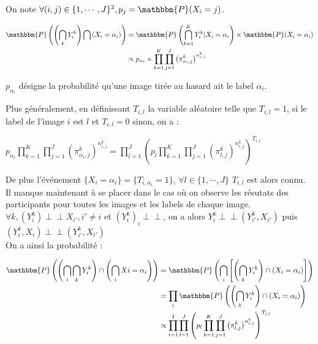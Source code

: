 \documentclass[frenchb]{report}
\newcommand{\1}{\mathbbm{1}}
\newcommand{\prob}{\mathbbm{P}}
\newcommand{\indep}{\perp \!\!\! \perp}
\theoremstyle{definition}\newtheorem{defn}{Définition}
\theoremstyle{definition}\newtheorem{exm}{Exemple}
\theoremstyle{definition}\newtheorem{nota}{Notation}
\theoremstyle{definition}\newtheorem{rem}{Remarque}
\begin{document}
On note $\forall (i,j) \in \{1, \cdots, J\}^2, p_j = \prob(X_i = j)$.\\

\begin{center}
	\begin{align*}
		\prob \left( \left( \displaystyle \bigcap_k Y^k_i \right) \bigcap \left(X_i = \alpha_i \right) \right) &= \prob \left( \displaystyle \bigcap_{k = 1}^K Y^k_i |X_i = \alpha_i \right) \times \prob(X_i = \alpha_i)\\
		& \propto p_{\alpha_i} \times \displaystyle \prod_{k=1}^K \displaystyle \prod_{j = 1}^J \left(\pi^k_{\alpha_i,j}\right)^{n^k_{i,j}}\\
	\end{align*}
\end{center}

$p_{\alpha_i}$ désigne la probabilité qu'une image tirée au hasard ait le label $\alpha_i$.

Plus généralement, en définissant $T_{i,l}$ la variable aléatoire telle que $T_{i,l} = 1$, si le label de l'image  $i$ est $l$ et $T_{i,l} = 0$ sinon, on a : \\

\begin{center}
	$p_{\alpha_i} \displaystyle \prod_{k=1}^K \displaystyle \prod_{j = 1}^J \left(\pi^k_{\alpha_i,j}\right)^{n^k_{i,j}} = \displaystyle \prod_{l=1}^J \left( p_l \displaystyle \prod_{k=1}^K \displaystyle \prod_{j = 1}^J \left(\pi^k_{l,j}\right)^{n^k_{i,j}} \right)^{T_{i,l}}$
\end{center}

De plus l'événement $\{X_i = \alpha_i \} = \{T_{i,\alpha_i} = 1\}$, $\forall l \in \{1, \cdots, J\}$ $T_{i,l}$ est alors connu.\\

Il manque maintenant à se placer dans le cas où on observe les résutats des participants pour toutes les images et les labels de chaque image.\\

$\forall k, (Y^k_i) \indep X_{i'}, i' \neq i$ et $(Y^k_i)_i \indep $, on a alors $Y^k_i \indep (Y^k_{i'},X_{i'})$ puis $(Y^k_i,X_i) \indep (Y^k_{i'},X_{i'})$\\
On a ainsi la probabilité : 

\begin{center}
	\begin{align*}
		\prob \left( \left( \displaystyle \bigcap_i \displaystyle \bigcap_k Y^k_i \right) \cap \left( \displaystyle \bigcap_i Xi = \alpha_i \right) \right) &= \prob \left( \displaystyle \bigcap_i \left[ \left( \displaystyle \bigcap_k Y^k_i \right) \cap \left(X_i = \alpha_i\right) \right] \right)\\
	&= \displaystyle \prod_i \prob \left( \left( \displaystyle \bigcap_k Y^k_i \right) \cap \left( X_i = \alpha_i \right) \right)\\
	&\propto \displaystyle \prod_{i=1}^I \displaystyle \prod_{l=1}^J \left( p_l \displaystyle \prod_{k=1}^K \displaystyle \prod_{j = 1}^J \left(\pi^k_{l,j}\right)^{n^k_{i,j}} \right)^{T_{i,l}}\\
	\end{align*}
\end{center}
\end{document}
